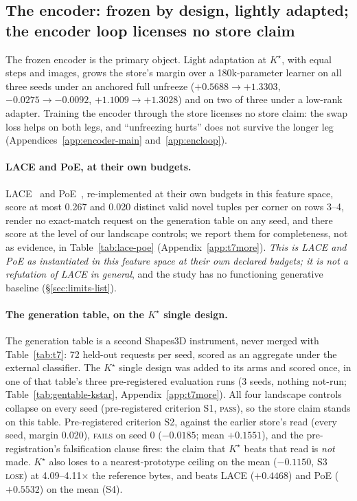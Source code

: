 \documentclass{article} %
\newcommand{\Kstar}{\ensuremath{K^{\star}}}
\begin{document}
\subsection{The encoder: frozen by design, lightly adapted; the encoder loop licenses no store claim}
\label{sec:adapt}\label{sec:bard}
The frozen encoder is the primary object. Light adaptation at $\Kstar$, with equal steps and
images, grows the store's margin over a 180k-parameter learner on all three seeds under an
anchored full unfreeze ($+0.5688\to+1.3303$, $-0.0275\to-0.0092$, $+1.1009\to+1.3028$) and on two
of three under a low-rank adapter. %
Training the encoder through the store licenses no store claim: the swap loss helps on both legs,
and ``unfreezing hurts'' does not survive the longer leg (Appendices~\ref{app:encoder-main}
and~\ref{app:encloop}).

\paragraph{LACE and PoE, at their own budgets.}
LACE~\citep{nie2021controllable} and PoE~\citep{hinton2002training}, re-implemented at their own
budgets in this feature space, score at most 0.267 and 0.020 distinct valid novel tuples per corner %
on rows 3--4, render no exact-match request on the generation table on any seed, and there score at
the level of our landscape controls; we report them for completeness, not as evidence, in
Table~\ref{tab:lace-poe} (Appendix~\ref{app:t7more}). \emph{This is LACE and PoE as instantiated in
this feature space at their own declared budgets; it is not a refutation of LACE in general}, and
the study has no functioning generative baseline (\S\ref{sec:limits-list}).

\paragraph{The generation table, on the $\Kstar$ single design.}
The generation table is a second Shapes3D instrument, never merged with Table~\ref{tab:t7}: 72 %
held-out requests per seed, scored as an aggregate under the external classifier. The $\Kstar$ single design was added
to its arms and scored once, in one of that table's three pre-registered evaluation runs (3 seeds,
nothing not-run; Table~\ref{tab:gentable-kstar}, %
Appendix~\ref{app:t7more}). All four landscape controls collapse on every seed (pre-registered criterion S1, %
\textsc{pass}), so the store claim stands on this table. Pre-registered criterion S2, against the earlier
store's read (every seed, margin 0.020), \textsc{fails} on seed 0 ($-0.0185$; mean $+0.1551$), and the %
pre-registration's falsification clause fires: the claim that $\Kstar$ beats that read is
\emph{not} made. $\Kstar$ also loses to a nearest-prototype ceiling on the mean %
($-0.1150$, S3 \textsc{lose}) at 4.09--4.11$\times$ the reference bytes, and beats LACE %
($+0.4468$) and PoE ($+0.5532$) on the mean (S4). %
\end{document}
